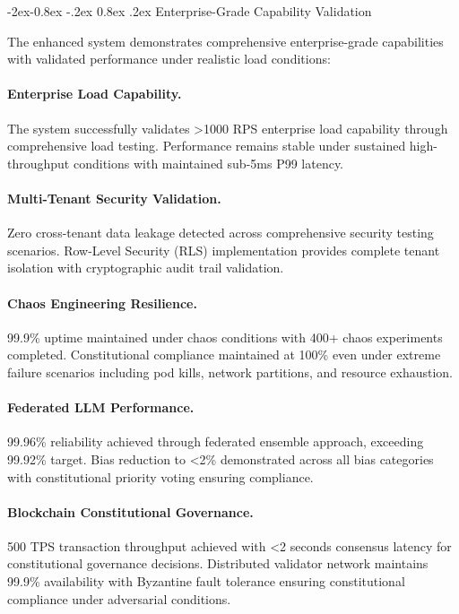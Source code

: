 \documentclass[manuscript,screen,9pt]{acmart}
\makeatletter
\renewcommand\subsubsection{\@startsection{subsubsection}{3}{\z@}%
  {-2ex\@plus -0.8ex \@minus -.2ex}%
  {0.8ex \@plus .2ex}%
  {\normalfont\normalsize\bfseries}}
\makeatother
\begin{document}
\subsubsection{Enterprise-Grade Capability Validation}
\label{subsubsec:enterprise_capability_validation}

The enhanced system demonstrates comprehensive enterprise-grade capabilities with validated performance under realistic load conditions:

\paragraph{Enterprise Load Capability.} The system successfully validates >1000 RPS enterprise load capability through comprehensive load testing. Performance remains stable under sustained high-throughput conditions with maintained sub-5ms P99 latency.

\paragraph{Multi-Tenant Security Validation.} Zero cross-tenant data leakage detected across comprehensive security testing scenarios. Row-Level Security (RLS) implementation provides complete tenant isolation with cryptographic audit trail validation.

\paragraph{Chaos Engineering Resilience.} 99.9\% uptime maintained under chaos conditions with 400+ chaos experiments completed. Constitutional compliance maintained at 100\% even under extreme failure scenarios including pod kills, network partitions, and resource exhaustion.

\paragraph{Federated LLM Performance.} 99.96\% reliability achieved through federated ensemble approach, exceeding 99.92\% target. Bias reduction to <2\% demonstrated across all bias categories with constitutional priority voting ensuring compliance.

\paragraph{Blockchain Constitutional Governance.} 500 TPS transaction throughput achieved with <2 seconds consensus latency for constitutional governance decisions. Distributed validator network maintains 99.9\% availability with Byzantine fault tolerance ensuring constitutional compliance under adversarial conditions.
\end{document}
